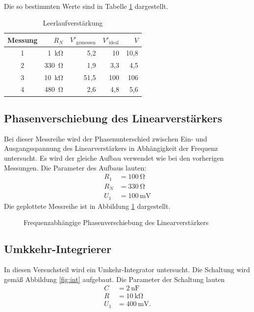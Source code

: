 Die so bestimmten Werte sind in Tabelle \ref{tab:leerlauf} dargestellt.
\begin{table}
	\centering
	\begin{tabular}{c r r r r}
		\toprule
		Messung & $R_N$ & $V'_\text{gemessen}$ & $V'_\text{ideal}$ & $V$ \\
		\midrule
		1 & \SI{1}{\kilo \ohm} & 5,2 & 10 & 10,8 \\
		2 & \SI{330}{\ohm} & 1,9 & 3,3 & 4,5 \\
		3 & \SI{10}{\kilo \ohm} & 51,5 & 100 & 106 \\
		4 & \SI{480}{\ohm} & 2,6 & 4,8 & 5,6 \\
		\bottomrule
	\end{tabular}
	\caption{Leerlaufverstärkung}
	\label{tab:leerlauf}
\end{table}

\subsection{Phasenverschiebung des Linearverstärkers}
Bei dieser Messreihe wird der Phasenunterschied zwischen Ein- und Ausgangsspannung des Linearverstärkers in Abhängigkeit der Frequenz untersucht.
Es wird der gleiche Aufbau verwendet wie bei den vorherigen Messungen.
Die Parameter des Aufbaus lauten:
\begin{align}
	R_1 &= \SI{100}{\ohm} \\
	R_N &= \SI{330}{\ohm} \\
	U_1 &= \SI{100}{\milli \volt}
\end{align}
Die geplottete Messreihe ist in Abbildung \ref{fig:phase} dargestellt.

\begin{figure}
	\centering
	\resizebox{\pltwidth}{!}{
		
	}
	\caption{Frequenzabhängige Phasenverschiebung des Linearverstärkers}
	\label{fig:phase}
\end{figure}

\subsection{Umkkehr-Integrierer}
In diesen Versuchsteil wird ein Umkehr-Integrator untersucht.
Die Schaltung wird gemäß Abbildung \ref{fig:int} aufgebaut.
Die Parameter der Schaltung lauten
\begin{align}
	C &= \SI{2}{\nano \farad} \\
	R &= \SI{10}{\kilo \ohm} \\
	U_1 &= \SI{400}{\milli \volt}.
\end{align}

